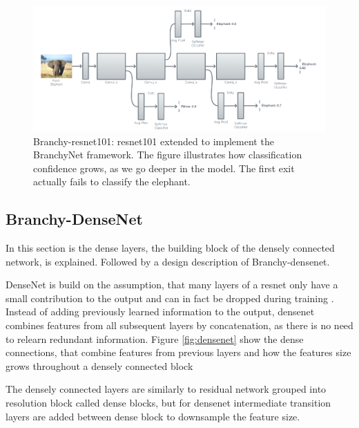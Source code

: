 \begin{figure}
	\centering
	\includegraphics[width=\linewidth]{figures/models/BResNet}
	\caption[B-\gls{resnet} architecture]{Branchy-\gls{resnet}101: \gls{resnet}101 extended to implement the BranchyNet framework. The figure illustrates how classification confidence grows, as we go deeper in the model. The first exit actually fails to classify the elephant. }
	\label{fig:b-resnet}
\end{figure}


\subsection{Branchy-DenseNet}

In this section is the dense layers, the building block of the densely connected network, is explained. Followed by a design description of Branchy-\gls{densenet}.

DenseNet \cite{huang_densely_2016} is build on the assumption, that many layers of a \gls{resnet} only have a small contribution to the output and can in fact be dropped during training \cite{huang_densely_2016}. Instead of adding previously learned information to the output, \gls{densenet} combines features from all subsequent layers by concatenation, as there is no need to relearn redundant information. Figure \ref{fig:densenet} show the dense connections, that combine features from previous layers and how the features size grows throughout a densely connected block 


The densely connected layers are similarly to residual network grouped into resolution block called dense blocks, but for \gls{densenet} intermediate transition layers are added between dense block to downsample the feature size. 


